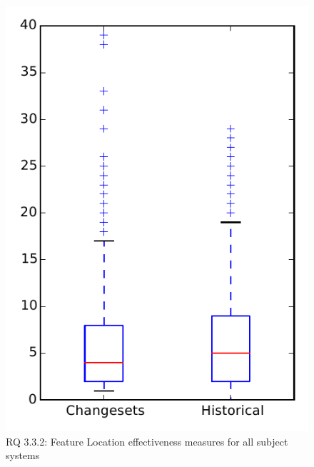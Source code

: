 
\begin{figure}
\centering
\includegraphics[height=0.4\textheight]{figures/flt/rq2_overview}
\caption{RQ 3.3.2: Feature Location effectiveness measures for all subject systems}
\label{fig:flt:rq2:overview}
\end{figure}
